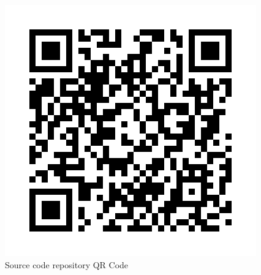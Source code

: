 \begin{figure}
  \centering
  \caption[Source code repository, QR Code]{Source code repository QR Code}
  \label{fig:qr_code_repository}
  \includegraphics[width=0.8\linewidth]{img/qr_code_repository.png}
\end{figure}
